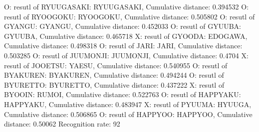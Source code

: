 O: resutl of RYUUGASAKI: RYUUGASAKI, Cumulative distance: 0.394532
O: resutl of RYOOGOKU: RYOOGOKU, Cumulative distance: 0.505802
O: resutl of GYANGU: GYANGU, Cumulative distance: 0.452033
O: resutl of GYUUBA: GYUUBA, Cumulative distance: 0.465718
X: resutl of GYOODA: EDOGAWA, Cumulative distance: 0.498318
O: resutl of JARI: JARI, Cumulative distance: 0.503285
O: resutl of JUUMONJI: JUUMONJI, Cumulative distance: 0.4704
X: resutl of JOOETSU: YAESU, Cumulative distance: 0.540955
O: resutl of BYAKUREN: BYAKUREN, Cumulative distance: 0.494244
O: resutl of BYURETTO: BYURETTO, Cumulative distance: 0.437222
X: resutl of BYOOIN: RUMOI, Cumulative distance: 0.522763
O: resutl of HAPPYAKU: HAPPYAKU, Cumulative distance: 0.483947
X: resutl of PYUUMA: HYUUGA, Cumulative distance: 0.506865
O: resutl of HAPPYOO: HAPPYOO, Cumulative distance: 0.50062
Recognition rate: 92%
